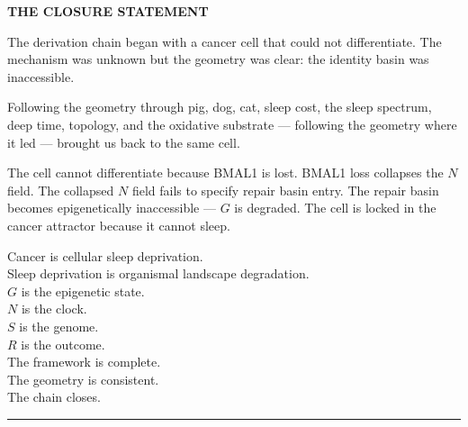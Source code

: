 \documentclass[10pt, a4paper]{article}
\begin{document}
\begin{mdframed}[backgroundcolor=claimbox,
  linecolor=claimbox,linewidth=0pt,
  innertopmargin=0.7em,innerbottommargin=0.7em,
  innerleftmargin=1.0em,innerrightmargin=1.0em]
\color{white}
\textbf{THE CLOSURE STATEMENT}

\medskip
The derivation chain began with a cancer
cell that could not differentiate.
The mechanism was unknown but the
geometry was clear: the identity basin
was inaccessible.

\medskip
Following the geometry through pig,
dog, cat, sleep cost, the sleep
spectrum, deep time, topology, and
the oxidative substrate --- following
the geometry where it led --- brought
us back to the same cell.

\medskip
The cell cannot differentiate because
BMAL1 is lost. BMAL1 loss collapses
the $N$ field. The collapsed $N$ field
fails to specify repair basin entry.
The repair basin becomes epigenetically
inaccessible --- $G$ is degraded.
The cell is locked in the cancer
attractor because it cannot sleep.

\medskip
Cancer is cellular sleep deprivation.\\
Sleep deprivation is organismal
landscape degradation.\\
$G$ is the epigenetic state.\\
$N$ is the clock.\\
$S$ is the genome.\\
$R$ is the outcome.\\
The framework is complete.\\
The geometry is consistent.\\
The chain closes.
\end{mdframed}

\vspace{0.5em}
\noindent\textcolor{rulecolor}
{\rule{\linewidth}{0.8pt}}
\end{document}
